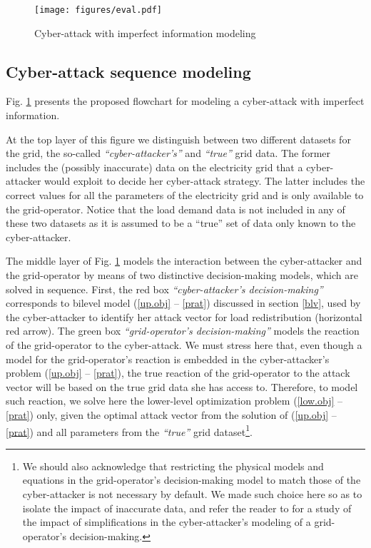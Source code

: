 \documentclass{IEEEtran4PSCC}
\begin{document}





\begin{figure}[h]
\centering
\texttt{[image: figures/eval.pdf]}
\caption{Cyber-attack with imperfect information modeling}
\label{fig:overview}
\end{figure}

\subsection{Cyber-attack sequence modeling}
\label{attack_model}
Fig. \ref{fig:overview} presents the proposed flowchart for modeling a cyber-attack with imperfect information.%

At the top layer of this figure we distinguish between two different datasets for the  grid, the so-called \emph{``cyber-attacker's''} and \emph{``true''} grid data. The former includes the (possibly inaccurate) data on the electricity grid that a cyber-attacker would exploit  to decide her cyber-attack strategy. The latter includes the correct values for all the parameters of the electricity grid and is only available to the grid-operator. Notice that the load demand data is not included in any of these two datasets as it is assumed to be a ``true'' set of data only known to the cyber-attacker.


The middle layer of Fig. \ref{fig:overview} models the interaction between the cyber-attacker and the grid-operator by means of two distinctive decision-making models, which are solved in sequence. First, the red box \emph{``cyber-attacker's decision-making''} corresponds to  bilevel model (\ref{up.obj} -- \ref{prat}) discussed in section \ref{blv}, used by the cyber-attacker to identify her attack vector for load redistribution (horizontal red arrow). The green box \emph{``grid-operator's decision-making''} models the reaction of the grid-operator to the cyber-attack. We must stress here that, even though a model for the grid-operator's reaction is embedded in the cyber-attacker's problem (\ref{up.obj} -- \ref{prat}), the true reaction of the grid-operator to the attack vector will be based on the true grid data she has access to. Therefore, to model such reaction, we solve here the lower-level optimization problem (\ref{low.obj} -- \ref{prat}) only,
given the optimal attack vector from the solution of (\ref{up.obj} -- \ref{prat}) and all parameters from the \emph{``true''} grid dataset\footnote{We should also acknowledge that restricting the physical models and equations in the grid-operator's decision-making model to match those of the cyber-attacker is not necessary by default. We made such choice here so as to isolate the impact of inaccurate data, and refer the reader to \cite{chu21} for a study of the impact of simplifications in the cyber-attacker's modeling of a grid-operator's decision-making.}.
\end{document}
